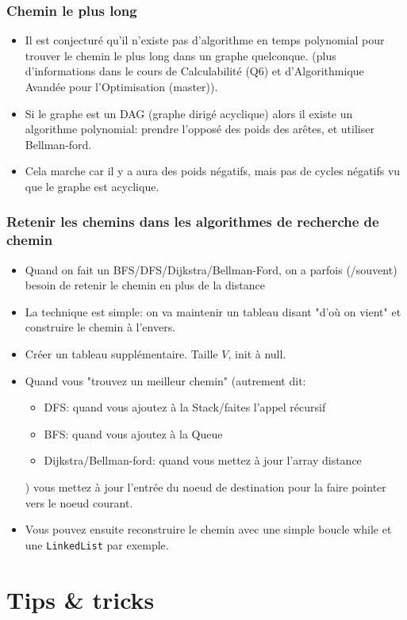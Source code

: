 \documentclass[8pt,aspectratio=169]{beamer}
\begin{document}
\begin{frame}[fragile]
\frametitle{Chemin le plus long}
\begin{itemize}
	\item Il est conjecturé qu'il n'existe pas d'algorithme en temps polynomial pour trouver le chemin le plus long dans un graphe quelconque. (plus d'informations dans le cours de Calculabilité (Q6) et d'Algorithmique Avandée pour l'Optimisation (master)).
	\item Si le graphe est un DAG (graphe dirigé acyclique) alors il existe un algorithme polynomial: prendre l'opposé des poids des arêtes, et utiliser Bellman-ford.
	\item Cela marche car il y a aura des poids négatifs, mais pas de cycles négatifs vu que le graphe est acyclique.
\end{itemize}
\end{frame}

\begin{frame}
\frametitle{Retenir les chemins dans les algorithmes de recherche de chemin}
\begin{itemize}
	\item Quand on fait un BFS/DFS/Dijkstra/Bellman-Ford, on a parfois (/souvent) besoin de retenir le chemin en plus de la distance
	\item La technique est simple: on va maintenir un tableau disant "d'où on vient" et construire le chemin à l'envers.
	\item Créer un tableau supplémentaire. Taille $V$, init à null.
	\item Quand vous "trouvez un meilleur chemin" (autrement dit:
	\begin{itemize}
		\item DFS: quand vous ajoutez à la Stack/faites l'appel récursif
		\item BFS: quand vous ajoutez à la Queue
		\item Dijkstra/Bellman-ford: quand vous mettez à jour l'array distance
	\end{itemize}
	)
	vous mettez à jour l'entrée du noeud de destination pour la faire pointer vers le noeud courant.
	\item Vous pouvez ensuite reconstruire le chemin avec une simple boucle while et une \texttt{LinkedList} par exemple.
\end{itemize}
\end{frame}

\section{Tips \& tricks}
\end{document}
